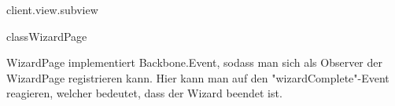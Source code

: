 \begin{texdocpackage}{client.view.subview}
\begin{texdocclass}{class}{WizardPage}
\begin{texdocclassintro}
 WizardPage implementiert Backbone.Event, sodass man sich als Observer der
 WizardPage registrieren kann. Hier kann man auf den "wizardComplete"-Event
 reagieren, welcher bedeutet, dass der Wizard beendet ist.\end{texdocclassintro}
\begin{texdocclassfields}
\end{texdocclassfields}
\begin{texdocclassconstructors}
\end{texdocclassconstructors}
\begin{texdocclassmethods}
\end{texdocclassmethods}
\end{texdocclass}


\end{texdocpackage}



